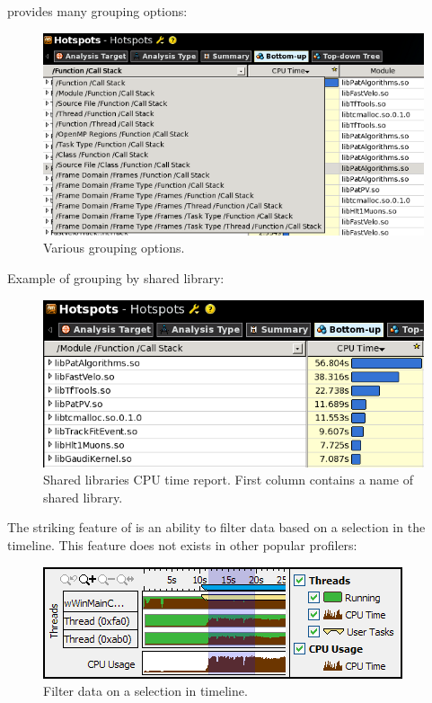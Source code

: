 \documentclass[a4paper]{jpconf}
\begin{document}
\amp provides many grouping options: 
\begin{figure}[H]
\begin{minipage}{\textwidth}
\includegraphics[width=\textwidth]{figs/fig02.png}
\caption{\label{fig02}Various grouping options.}
\end{minipage}
\end{figure}

Example of grouping by shared library:

\begin{figure}[H]
\begin{minipage}{\textwidth}
\includegraphics[width=\textwidth]{figs/fig03.png}
\caption{\label{fig03}Shared libraries  CPU time report. First column contains a name of shared library.}
\end{minipage}
\end{figure}


The striking feature of \amp is an ability to filter data based on a selection in the timeline. This feature 
does not exists in other popular profilers:

\begin{figure}[H]
\begin{minipage}{\textwidth}
\includegraphics[]{figs/fig04.png}
\caption{\label{fig04}Filter data on a selection in timeline.}
\end{minipage}
\end{figure}
\end{document}

